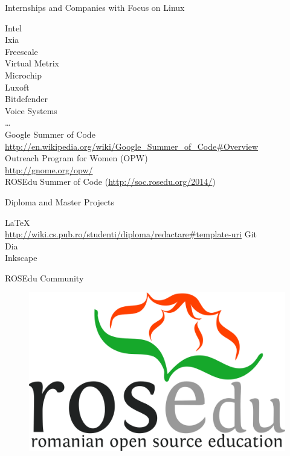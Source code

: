 \documentclass{paper}
\begin{document}
\begin{frame}{Internships and Companies with Focus on Linux}
  \begin{center}
    {\small
      \pause Intel \\
      \pause Ixia \\
      \pause Freescale \\
      \pause Virtual Metrix \\
      \pause Microchip \\
      \pause Luxoft \\
      \pause Bitdefender \\
      \pause Voice Systems \\
      \pause \ldots \\
      \vspace{0.3cm}
      \pause Google Summer of Code \\
      \url{http://en.wikipedia.org/wiki/Google\_Summer\_of\_Code\#Overview} \\
      \vspace{0.3cm}
      \pause Outreach Program for Women (OPW) \\
      \url{http://gnome.org/opw/} \\
      \vspace{0.3cm}
      \pause ROSEdu Summer of Code (\url{http://soc.rosedu.org/2014/})
    }
  \end{center}
\end{frame}

\begin{frame}{Diploma and Master Projects}
  \begin{center}
    {\small
      \pause \LaTeX \\
      \url{http://wiki.cs.pub.ro/studenti/diploma/redactare\#template-uri}
      \vspace{0.3cm}
      \pause Git \\
      \vspace{0.3cm}
      \pause Dia \\
      \vspace{0.3cm}
      \pause Inkscape
    }
  \end{center}
\end{frame}

\begin{frame}{ROSEdu Community}
  \begin{figure}
    \centering
      \includegraphics[width=0.6\linewidth]{img/rosedu-logo} \\
  \end{figure}
\end{frame}
\end{document}
